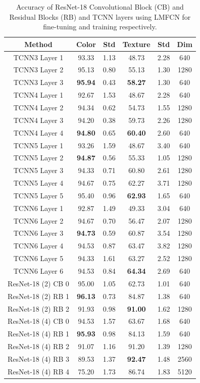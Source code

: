 \documentclass[conference]{IEEEtran}
\begin{document}
\begin{table}[htbp]
\caption{Accuracy of ResNet-18 Convolutional Block (CB) and Residual Blocks (RB) and TCNN layers using LMFCN for fine-tuning and training respectively.}
\begin{center}
\begin{tabular}{c|c|c|c|c|c}
\hline
\textbf{Method} & \textbf{Color} & \textbf{Std} & \textbf{Texture} & \textbf{Std} & \textbf{Dim}\\
\hline
TCNN3 Layer 1 & 93.33 & 1.13 & 48.73 & 2.28 & 640 \\
TCNN3 Layer 2 & 95.13 & 0.80 & 55.13 & 1.30 & 1280 \\
TCNN3 Layer 3 & \textbf{95.94} & 0.43 & \textbf{58.27} & 1.30 & 640 \\
TCNN4 Layer 1 & 92.67 & 1.53 & 48.67 & 2.28 & 640 \\
TCNN4 Layer 2 & 94.34 & 0.62 & 54.73 & 1.55 & 1280 \\
TCNN4 Layer 3 & 94.20 & 0.38 & 59.73 & 2.26 & 1280 \\
TCNN4 Layer 4 & \textbf{94.80} & 0.65 & \textbf{60.40} & 2.60 & 640 \\
TCNN5 Layer 1 & 93.26 & 1.59 & 48.67 & 3.40 & 640 \\
TCNN5 Layer 2 & \textbf{94.87} & 0.56 & 55.33 & 1.05 & 1280 \\
TCNN5 Layer 3 & 94.33 & 0.71 & 60.80 & 2.61 & 1280 \\
TCNN5 Layer 4 & 94.67 & 0.75 & 62.27 & 3.71 & 1280 \\
TCNN5 Layer 5 & 95.40 & 0.96 & \textbf{62.93} & 1.65 & 640 \\
TCNN6 Layer 1 & 92.87 & 1.49 & 49.33 & 3.04 & 640 \\
TCNN6 Layer 2 & 94.67 & 0.70 & 56.47 & 2.07 & 1280 \\
TCNN6 Layer 3 & \textbf{94.73} & 0.59 & 60.87 & 3.54 & 1280 \\
TCNN6 Layer 4 & 94.53 & 0.87 & 63.47 & 3.82 & 1280 \\
TCNN6 Layer 5 & 94.33 & 1.61 & 63.27 & 2.52 & 1280 \\
TCNN6 Layer 6 & 94.53 & 0.84 & \textbf{64.34} & 2.69 & 640 \\
ResNet-18 (2) CB 0 & 95.00 & 1.05 & 62.73 & 1.01 & 640 \\
ResNet-18 (2) RB 1 & \textbf{96.13} & 0.73 & 84.87 & 1.38 & 640 \\
ResNet-18 (2) RB 2 & 91.93 & 0.98 & \textbf{91.00} & 1.62 & 1280 \\
ResNet-18 (4) CB 0 & 94.53 & 1.57 & 63.67 & 1.68 & 640 \\
ResNet-18 (4) RB 1 & \textbf{95.93} & 0.98 & 84.13 & 1.59 & 640 \\
ResNet-18 (4) RB 2 & 91.07 & 1.16 & 91.20 & 1.39 & 1280 \\
ResNet-18 (4) RB 3 & 89.53 & 1.37 & \textbf{92.47} & 1.48 & 2560 \\
ResNet-18 (4) RB 4 & 75.20 & 1.73 & 86.74 & 1.83 & 5120 \\
\hline
\end{tabular}
\label{tab1}
\end{center}
\end{table}
\end{document}
